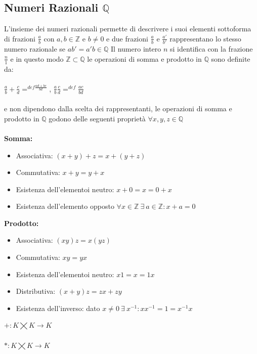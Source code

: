 \documentclass{report}
\begin{document}
\subsection{Numeri Razionali $\mathbb{Q}$}
L'insieme dei numeri razionali permette di descrivere i suoi elementi sottoforma di frazioni $\frac{a}{b}$ con $a, b \in \mathbb{Z}$ e $b \neq 0$ e due frazioni $\frac{a}{b}$ e $\frac{a'}{b'}$ rappresentano lo stesso numero razionale se $ab' = a'b \in \mathbb{Q}$
Il numero intero $n$ si identifica con la frazione $\frac{n}{1}$ e in questo modo $\mathbb{Z} \subset \mathbb{Q}$ le operazioni di somma e prodotto in $\mathbb{Q}$ sono definite da:
\\ \\
$\frac{a}{b} + \frac{c}{d} =^{def \frac{ad + bc}{bd}}$, $\frac{a}{b}\frac{c}{d} =^{def} \frac{ac}{bd}$
\\ \\
e non dipendono dalla scelta dei rappresentanti, le operazioni di somma e prodotto in $\mathbb{Q}$ godono delle seguenti proprietà $\forall x, y, z \in \mathbb{Q}$
\\ \\
\textbf{Somma:}
\begin{itemize}
    \item{Associativa: $(x + y) + z = x + (y + z)$}
    \item{Commutativa: $x + y = y + x$}
    \item{Esistenza dell'elementoi neutro: $x + 0 = x = 0 + x$}
    \item{Esistenza dell'elemento opposto $\forall x \in \mathbb{Z} \ \exists \  a \in \mathbb{Z} : x + a = 0$}
\end{itemize}
\textbf{Prodotto:}
\begin{itemize}
    \item{Associativa: $(xy)z = x(yz)$}
    \item{Commutativa: $xy = yx$}
    \item{Esistenza dell'elementoi neutro: $x1 = x = 1x$}
    \item{Distributiva: $(x + y)z = zx + zy$}
    \item{Esistenza dell'inverso: dato $x \neq 0 \ \exists \ x^{-1} : xx^{-1} = 1 = x^{-1}x$}
\end{itemize}
$+ : K \varprod K \rightarrow K$ \\ \\
$* : K \varprod K \rightarrow K$ \\ \\
\end{document}
